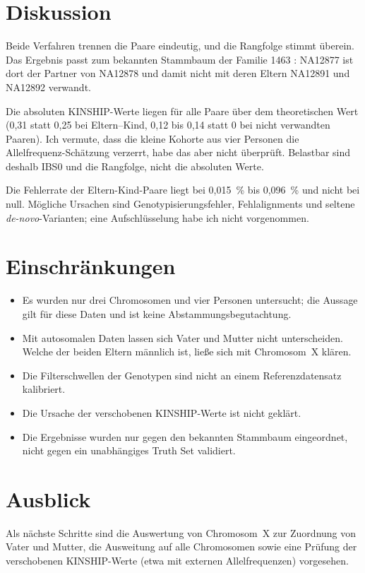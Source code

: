 \documentclass[10pt,a4paper,twocolumn]{article}
\begin{document}
\section{Diskussion}
Beide Verfahren trennen die Paare eindeutig, und die Rangfolge stimmt überein. Das Ergebnis passt zum bekannten Stammbaum der Familie 1463 \citep{eberle2017}: NA12877 ist dort der Partner von NA12878 und damit nicht mit deren Eltern NA12891 und NA12892 verwandt.

Die absoluten KINSHIP-Werte liegen für alle Paare über dem theoretischen Wert (0,31 statt 0,25 bei Eltern--Kind, 0,12 bis 0,14 statt 0 bei nicht verwandten Paaren). Ich vermute, dass die kleine Kohorte aus vier Personen die Allelfrequenz-Schätzung verzerrt, habe das aber nicht überprüft. Belastbar sind deshalb IBS0 und die Rangfolge, nicht die absoluten Werte.

Die Fehlerrate der Eltern-Kind-Paare liegt bei 0,015~\% bis 0,096~\% und nicht bei null. Mögliche Ursachen sind Genotypisierungsfehler, Fehlalignments und seltene \emph{de-novo}-Varianten; eine Aufschlüsselung habe ich nicht vorgenommen.

\section{Einschränkungen}
\begin{itemize}
\item Es wurden nur drei Chromosomen und vier Personen untersucht; die Aussage gilt für diese Daten und ist keine Abstammungsbegutachtung.
\item Mit autosomalen Daten lassen sich Vater und Mutter nicht unterscheiden. Welche der beiden Eltern männlich ist, ließe sich mit Chromosom~X klären.
\item Die Filterschwellen der Genotypen sind nicht an einem Referenzdatensatz kalibriert.
\item Die Ursache der verschobenen KINSHIP-Werte ist nicht geklärt.
\item Die Ergebnisse wurden nur gegen den bekannten Stammbaum eingeordnet, nicht gegen ein unabhängiges Truth Set validiert.
\end{itemize}

\section{Ausblick}
Als nächste Schritte sind die Auswertung von Chromosom~X zur Zuordnung von Vater und Mutter, die Ausweitung auf alle Chromosomen sowie eine Prüfung der verschobenen KINSHIP-Werte (etwa mit externen Allelfrequenzen) vorgesehen.
\end{document}
